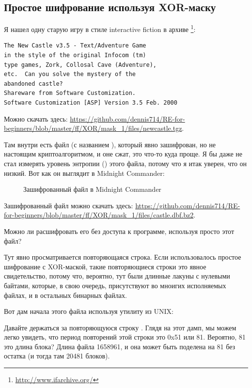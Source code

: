 \subsection{Простое шифрование используя XOR-маску}
\label{XOR_mask_1}

Я нашел одну старую игру в стиле interactive fiction в архиве \footnote{\url{http://www.ifarchive.org/}}:

\begin{lstlisting}
The New Castle v3.5 - Text/Adventure Game
in the style of the original Infocom (tm)
type games, Zork, Collosal Cave (Adventure),
etc.  Can you solve the mystery of the
abandoned castle?
Shareware from Software Customization.
Software Customization [ASP] Version 3.5 Feb. 2000
\end{lstlisting}

Можно скачать здесь: \url{https://github.com/dennis714/RE-for-beginners/blob/master/ff/XOR/mask_1/files/newcastle.tgz}.

Там внутри есть файл (с названием ), который явно зашифрован, но не настоящим криптоалгоритмом,
и оне сжат, это что-то куда проще.
Я бы даже не стал измерять уровень энтропии () этого файла, потому что я итак уверен, что он низкий.
Вот как он выглядит в Midnight Commander:

\begin{figure}[H]
\centering
{}
\caption{Зашифрованный файл в Midnight Commander}
\end{figure}

Зашифрованный файл можно скачать здесь:
\url{https://github.com/dennis714/RE-for-beginners/blob/master/ff/XOR/mask_1/files/castle.dbf.bz2}.

Можно ли расшифровать его без доступа к программе, используя просто этот файл?

Тут явно просматривается повторяющаяся строка. 
Если использовалось простое шифрование с XOR-маской, такие повторяющиеся строки это явное свидетельство,
потому что, вероятно, тут были длинные лакуны с нулевыми байтами, которые, в свою очередь, присутствуют
во мноигих исполняемых файлах, и в остальных бинарных файлах.

Вот дам начала этого файла используя утилиту  из UNIX:



Давайте держаться за повторяющуюся строку .
Глядя на этот дамп, мы можем легко увидеть, что период повторений этой строки это 0x51 или 81.
Вероятно, 81 это длина блока?
Длина файла 1658961, и она может быть поделена на 81 без остатка (и тогда там 20481 блоков).

